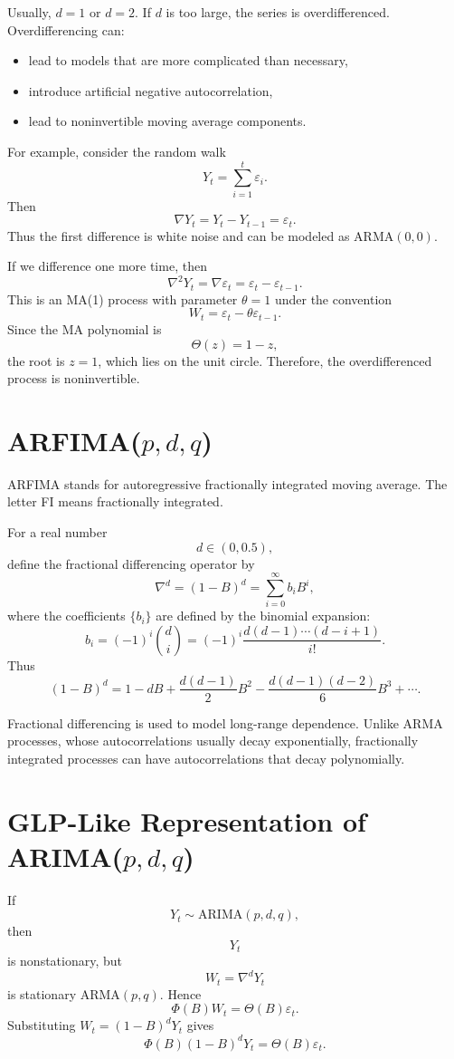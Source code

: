 \documentclass[12pt,oneside]{book}
\numberwithin{equation}{section}
\theoremstyle{definition}
\theoremstyle{plain}
\theoremstyle{remark}
\begin{document}
Usually, $d=1$ or $d=2$. If $d$ is too large, the series is overdifferenced. Overdifferencing can:

\begin{itemize}
\item lead to models that are more complicated than necessary,
\item introduce artificial negative autocorrelation,
\item lead to noninvertible moving average components.
\end{itemize}

For example, consider the random walk
\[
Y_t=\sum_{i=1}^t\varepsilon_i.
\]
Then
\[
\nabla Y_t
=
Y_t-Y_{t-1}
=
\varepsilon_t.
\]
Thus the first difference is white noise and can be modeled as ARMA$(0,0)$.

If we difference one more time, then
\[
\nabla^2Y_t
=
\nabla\varepsilon_t
=
\varepsilon_t-\varepsilon_{t-1}.
\]
This is an MA(1) process with parameter $\theta=1$ under the convention
\[
W_t=\varepsilon_t-\theta\varepsilon_{t-1}.
\]
Since the MA polynomial is
\[
\Theta(z)=1-z,
\]
the root is $z=1$, which lies on the unit circle. Therefore, the overdifferenced process is noninvertible.

\section*{ARFIMA($p,d,q$)}

ARFIMA stands for autoregressive fractionally integrated moving average. The letter FI means fractionally integrated.

For a real number
\[
d\in(0,0.5),
\]
define the fractional differencing operator by
\[
\nabla^d
=
(1-B)^d
=
\sum_{i=0}^{\infty}b_iB^i,
\]
where the coefficients $\{b_i\}$ are defined by the binomial expansion:
\[
b_i
=
(-1)^i\binom{d}{i}
=
(-1)^i
\frac{d(d-1)\cdots(d-i+1)}{i!}.
\]
Thus
\[
(1-B)^d
=
1-dB+\frac{d(d-1)}{2}B^2-\frac{d(d-1)(d-2)}{6}B^3+\cdots.
\]

Fractional differencing is used to model long-range dependence. Unlike ARMA processes, whose autocorrelations usually decay exponentially, fractionally integrated processes can have autocorrelations that decay polynomially.

\section{GLP-Like Representation of ARIMA($p,d,q$)}

If
\[
Y_t\sim \mathrm{ARIMA}(p,d,q),
\]
then
\[
Y_t
\]
is nonstationary, but
\[
W_t=\nabla^dY_t
\]
is stationary ARMA$(p,q)$. Hence
\[
\Phi(B)W_t=\Theta(B)\varepsilon_t.
\]
Substituting $W_t=(1-B)^dY_t$ gives
\[
\Phi(B)(1-B)^dY_t=\Theta(B)\varepsilon_t.
\]
\end{document}
